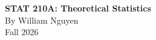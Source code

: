 \documentclass[10pt, oneside]{book}
\begin{document}
\frontmatter
\begin{titlepage}
    \centering
    \vspace*{8cm}

    {\Huge \textbf{STAT 210A: Theoretical Statistics}}\\[1cm]
    {\Large By William Nguyen}\\[0.5cm]
    {\large Fall 2026}\\
    \vfill
    
\end{titlepage}

\tableofcontents
\newpage
{}

\clearpage
\mainmatter
\pagestyle{plain}


\end{document}
